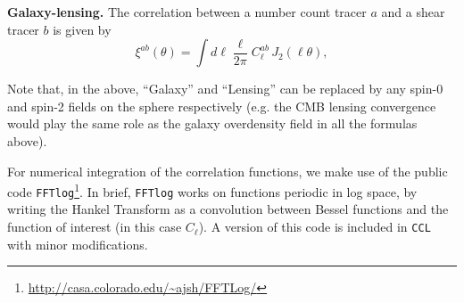 \documentclass[\docopts]{\docclass}
\newcommand{\ccl}{{\tt CCL}\xspace}
\begin{document}
{\bf Galaxy-lensing.} The correlation between a number count tracer $a$ and a shear tracer $b$ is given by
\begin{equation}
  \xi^{ab}(\theta) = \int d\ell \frac{\ell}{2\pi} C^{ab}_\ell\, J_2(\ell\theta),
\end{equation}

Note that, in the above, ``Galaxy'' and ``Lensing'' can be replaced by any spin-0 and spin-2 fields on the sphere respectively (e.g. the CMB lensing convergence would play the same role as the galaxy overdensity field in all the formulas above).

For numerical integration of the correlation functions, we make use of the public code {\tt FFTlog}\footnote{\url{http://casa.colorado.edu/~ajsh/FFTLog/}}\citep{Hamilton2000,Talman2009}. In brief, {\tt FFTlog} works on functions periodic in log space, by writing the Hankel Transform as a convolution between Bessel functions and the function of interest (in this case $C_\ell$). A version of this code is included in \ccl with minor modifications.

%
%
\end{document}
